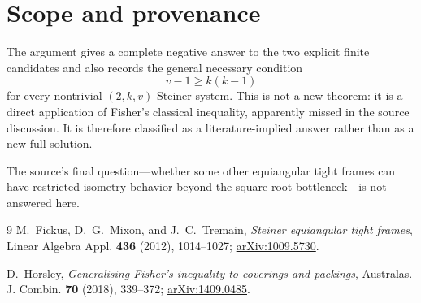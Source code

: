 \documentclass[11pt]{article}
\begin{document}
\section{Scope and provenance}

The argument gives a complete negative answer to the two explicit finite
candidates and also records the general necessary condition
\[
 v-1\geq k(k-1)
\]
for every nontrivial \((2,k,v)\)-Steiner system.  This is not a new theorem:
it is a direct application of Fisher's classical inequality, apparently
missed in the source discussion.  It is therefore classified as a
literature-implied answer rather than as a new full solution.

The source's final question---whether some other equiangular tight frames
can have restricted-isometry behavior beyond the square-root bottleneck---is
not answered here.

\begin{thebibliography}{9}
M.~Fickus, D.~G.~Mixon, and J.~C.~Tremain,
\emph{Steiner equiangular tight frames},
Linear Algebra Appl. \textbf{436} (2012), 1014--1027;
\href{https://arxiv.org/abs/1009.5730}{arXiv:1009.5730}.

D.~Horsley,
\emph{Generalising Fisher's inequality to coverings and packings},
Australas. J. Combin. \textbf{70} (2018), 339--372;
\href{https://arxiv.org/abs/1409.0485}{arXiv:1409.0485}.
\end{thebibliography}
\end{document}
